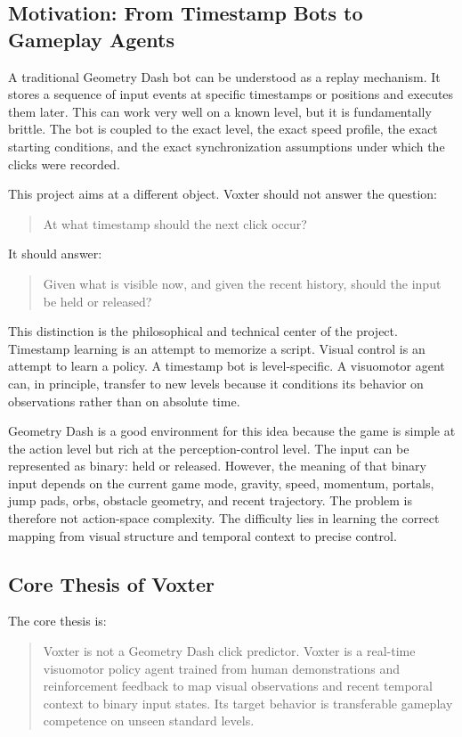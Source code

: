\documentclass[11pt]{article}
\begin{document}
\subsection{Motivation: From Timestamp Bots to Gameplay Agents}

A traditional Geometry Dash bot can be understood as a replay mechanism. It stores a sequence of input events at specific timestamps or positions and executes them later. This can work very well on a known level, but it is fundamentally brittle. The bot is coupled to the exact level, the exact speed profile, the exact starting conditions, and the exact synchronization assumptions under which the clicks were recorded.

This project aims at a different object. Voxter should not answer the question:
\begin{quote}
At what timestamp should the next click occur?
\end{quote}
It should answer:
\begin{quote}
Given what is visible now, and given the recent history, should the input be held or released?
\end{quote}

This distinction is the philosophical and technical center of the project. Timestamp learning is an attempt to memorize a script. Visual control is an attempt to learn a policy. A timestamp bot is level-specific. A visuomotor agent can, in principle, transfer to new levels because it conditions its behavior on observations rather than on absolute time.

Geometry Dash is a good environment for this idea because the game is simple at the action level but rich at the perception-control level. The input can be represented as binary: held or released. However, the meaning of that binary input depends on the current game mode, gravity, speed, momentum, portals, jump pads, orbs, obstacle geometry, and recent trajectory. The problem is therefore not action-space complexity. The difficulty lies in learning the correct mapping from visual structure and temporal context to precise control.

\subsection{Core Thesis of Voxter}

The core thesis is:
\begin{quote}
Voxter is not a Geometry Dash click predictor. Voxter is a real-time visuomotor policy agent trained from human demonstrations and reinforcement feedback to map visual observations and recent temporal context to binary input states. Its target behavior is transferable gameplay competence on unseen standard levels.
\end{quote}
\end{document}
